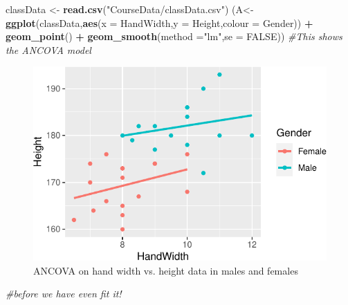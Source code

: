 \documentclass[
  a4paperpaper,
]{book}
\newenvironment{Shaded}{\begin{snugshade}}{\end{snugshade}}
\newcommand{\CommentTok}[1]{\textcolor[rgb]{0.56,0.35,0.01}{\textit{#1}}}
\newcommand{\DataTypeTok}[1]{\textcolor[rgb]{0.13,0.29,0.53}{#1}}
\newcommand{\KeywordTok}[1]{\textcolor[rgb]{0.13,0.29,0.53}{\textbf{#1}}}
\newcommand{\NormalTok}[1]{#1}
\newcommand{\OperatorTok}[1]{\textcolor[rgb]{0.81,0.36,0.00}{\textbf{#1}}}
\newcommand{\OtherTok}[1]{\textcolor[rgb]{0.56,0.35,0.01}{#1}}
\newcommand{\StringTok}[1]{\textcolor[rgb]{0.31,0.60,0.02}{#1}}
\begin{document}
\begin{Shaded}
\begin{Highlighting}[]
\NormalTok{classData \textless{}{-}}\StringTok{ }\KeywordTok{read.csv}\NormalTok{(}\StringTok{"CourseData/classData.csv"}\NormalTok{)}
\NormalTok{(A\textless{}{-}}\KeywordTok{ggplot}\NormalTok{(classData,}\KeywordTok{aes}\NormalTok{(}\DataTypeTok{x =}\NormalTok{ HandWidth,}\DataTypeTok{y =}\NormalTok{ Height,}\DataTypeTok{colour =}\NormalTok{ Gender)) }\OperatorTok{+}
\StringTok{  }\KeywordTok{geom\_point}\NormalTok{() }\OperatorTok{+}\StringTok{ }
\StringTok{  }\KeywordTok{geom\_smooth}\NormalTok{(}\DataTypeTok{method =}\StringTok{"lm"}\NormalTok{,}\DataTypeTok{se =} \OtherTok{FALSE}\NormalTok{)) }\CommentTok{\#This shows the ANCOVA model }
\end{Highlighting}
\end{Shaded}

\begin{figure}[ht]

{\centering \includegraphics{BB852_files/figure-latex/exampleANCOVA-1} 

}

\caption{ANCOVA on hand width vs. height data in males and females}\label{fig:exampleANCOVA}
\end{figure}

\begin{Shaded}
\begin{Highlighting}[]
                                       \CommentTok{\#before we have even fit it!}
\end{Highlighting}
\end{Shaded}
\end{document}
